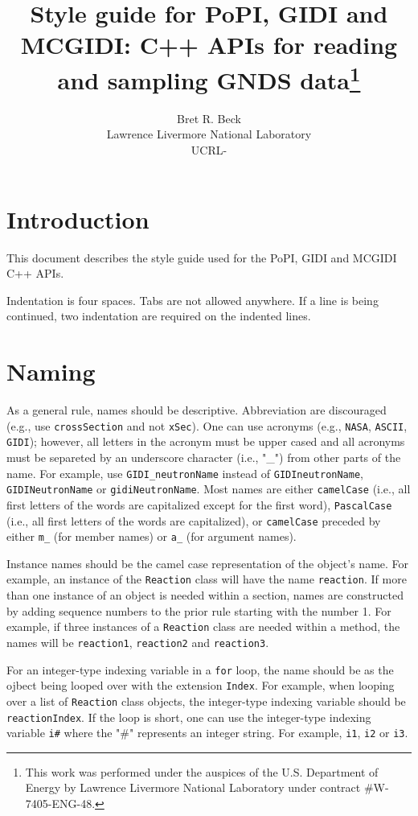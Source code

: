 \documentclass[11pt]{article}
\title{Style guide for PoPI, GIDI and MCGIDI: C++ APIs for reading and sampling GNDS data\footnote{
This work was performed under the auspices of the U.S. Department of Energy by
Lawrence Livermore National Laboratory under contract \#W-7405-ENG-48.}}
\author{{Bret R. Beck}\\Lawrence Livermore National Laboratory\\UCRL-}
\begin{document}
\maketitle

\pagebreak
\tableofcontents
\listoftables
\pagebreak

\section{Introduction}
This document describes the style guide used for the PoPI, GIDI and MCGIDI C++ APIs.

Indentation is four spaces. Tabs are not allowed anywhere. If a line is being continued, two indentation are required on the
indented lines.

\section{Naming}
    As a general rule, names should be descriptive. Abbreviation are discouraged (e.g., use \texttt{crossSection} and not \texttt{xSec}).
One can use acronyms (e.g., \texttt{NASA}, \texttt{ASCII}, \texttt{GIDI}); however, all letters in the acronym must be upper cased and
all acronyms must be separeted by an underscore character (i.e., "\_") from other parts of the name.
For example, use \texttt{GIDI\_neutronName} instead of \texttt{GIDIneutronName}, \texttt{GIDINeutronName} or \texttt{gidiNeutronName}.
Most names are either \texttt{camelCase} (i.e., all first letters of the words are capitalized except for the first word),
\texttt{PascalCase} (i.e., all first letters of the words are capitalized), or \texttt{camelCase} preceded by either \texttt{m\_} (for member names)
or \texttt{a\_} (for argument names).

Instance names should be the camel case representation of the object's name. For example, an instance of the \texttt{Reaction} class will have the
name \texttt{reaction}.  If more than one instance of an object is needed within a section, names are constructed by adding sequence numbers to
the prior rule starting with the number 1. For example, if three instances of a \texttt{Reaction} class are needed within a method, the names will be \texttt{reaction1},
\texttt{reaction2} and \texttt{reaction3}.

For an integer-type indexing variable in a \texttt{for} loop, the name should be as the ojbect being looped over with the extension \texttt{Index}. For example,
when looping over a list of \texttt{Reaction} class objects, the integer-type indexing variable should be \texttt{reactionIndex}.
If the loop is short, one can use the integer-type indexing variable \texttt{i\#} where the "\#" represents an integer string. For example, \texttt{i1},
\texttt{i2} or \texttt{i3}.
\end{document}
